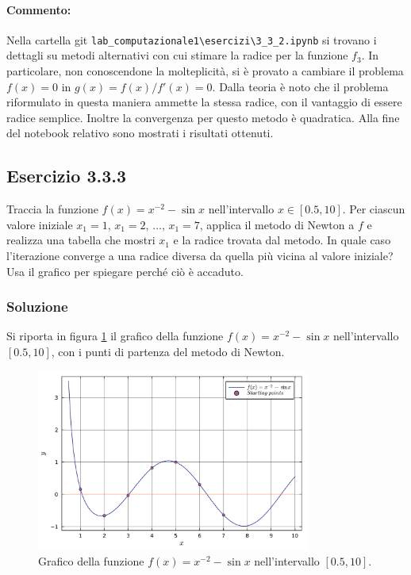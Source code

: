 \documentclass[letterpaper, 12pt]{article}
\numberwithin{equation}{section}    %
\begin{document}
\paragraph{Commento:}Nella cartella git \verb|lab_computazionale1\esercizi\3_3_2.ipynb| si trovano i dettagli
su metodi alternativi con cui stimare la radice per la funzione $f_3$. In particolare, non conoscendone la 
molteplicità, si è provato a cambiare il problema $f(x) = 0$ in $g(x) = f(x)/f'(x) = 0$. Dalla teoria è noto che il 
problema riformulato in questa maniera ammette la stessa radice, con il vantaggio di essere radice semplice. 
Inoltre la convergenza per questo metodo è quadratica. Alla fine del notebook relativo sono mostrati 
i risultati ottenuti.

\subsection{Esercizio 3.3.3}
\label{sec:333}
Traccia la funzione $f(x)=x^{-2} - \sin x$ nell'intervallo $x \in [0.5,10]$.  
Per ciascun valore iniziale $x_1=1,\, x_1=2,\,\ldots,\, x_1=7$, applica il metodo di Newton a $f$  
e realizza una tabella che mostri $x_1$ e la radice trovata dal metodo.  
In quale caso l'iterazione converge a una radice diversa da quella più vicina al valore iniziale?  
Usa il grafico per spiegare perché ciò è accaduto.

\subsubsection{Soluzione}
Si riporta in figura \ref{fig:es3_3_3_1} il grafico della funzione $f(x)=x^{-2} - \sin x$ nell'intervallo
$[0.5,10]$, con i punti di partenza del metodo di Newton. 
\begin{figure}[!ht]
    \centering
    \includegraphics[width=0.8\textwidth]{3331.pdf}
    \caption{Grafico della funzione $f(x)=x^{-2} - \sin x$ nell'intervallo $[0.5,10]$.}
    \label{fig:es3_3_3_1}
\end{figure}
\end{document}
